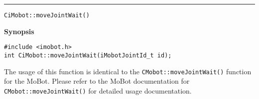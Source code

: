 \noindent
\vspace{5pt}
\rule{6.5in}{0.015in}
\noindent
{\LARGE \texttt{CiMobot::moveJointWait()}}\\
{}

\noindent
{\bf Synopsis}\\
\begin{verbatim}
#include <imobot.h>
int CiMobot::moveJointWait(iMobotJointId_t id);
\end{verbatim}

The usage of this function is identical to the
\texttt{CMobot::moveJointWait()} function for the MoBot.
Please refer to the MoBot documentation for \texttt{CMobot::moveJointWait()} for
detailed usage documentation.

